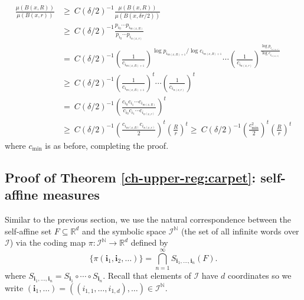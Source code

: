 \begin{align*}
\frac{\mu(B(x,R))}{\mu (B(x,r))}& \ge \ C(\delta/2)^{-1} \frac{\mu(B(x,R))}{\mu (B(x,\delta r/2))}  \\
& \ge \ C(\delta/2)^{-1} \frac{p_{i_0}\cdots p_{i_{m(x,R)}}}{p_{i_0}\cdots p_{i_{n(x,r)}}} \\
& = \ C(\delta/2)^{-1}  \left(\frac{1}{c_{i_{m(x,R)+1}}}\right)^{\log p_{i_{m(x,R)+1}}/\log c_{i_{m(x,R)+1}}} \cdots \left(\frac{1}{c_{i_{n(x,r)}}}\right)^{\frac{\log p_{i_{n(x,r)}}}{\log c_{i_{n(x,r)}}} } \\
& \ge\  C(\delta/2)^{-1}  \left( \frac{1}{c_{i_{m(x,R)+1}}}\right)^t \cdots \left( \frac{1}{c_{i_{n(x,r)}}}\right)^t \\
& = \ C(\delta/2)^{-1} \left( \frac{c_{i_0}c_{i_1} \cdots c_{i_{m(x,R)}}}{c_{i_0}c_{i_1} \cdots c_{i_{n(x,r)}}}\right)^t \\
& \ge \  C(\delta/2)^{-1} \left( \frac{c_{i_{m(x,R)}}c_{i_{n(x,r)}}}{2}  \right)^t  \left( \frac{R}{r}\right)^t \ge \  C(\delta/2)^{-1} \left( \frac{c_{\min}^2}{2}  \right)^t  \left( \frac{R}{r}\right)^t
\end{align*}
where $c_{\min}$ is as before, completing the proof.




\subsection{Proof of Theorem \ref{ch-upper-reg:carpet}: self-affine measures} \label{ch-upper-reg:self-affine}



Similar to the previous section, we use the natural correspondence between the self-affine set $F\subseteq \mathbb{R}^d$ and the symbolic space $\mathcal{I}^{\mathbb{N}}$ (the set of all infinite words over $\mathcal{I}$) via the coding map $\pi \colon \mathcal{I}^{\mathbb{N}} \rightarrow \mathbb{R}^d$ defined by 
\[
\{\pi(\textbf{i}_1, \textbf{i}_2, \ldots)\}=  \bigcap_{n=1}^\infty S_{\textbf{i}_1,\ldots, \textbf{i}_n}(F).
\]
where $ S_{\textbf{i}_1,\ldots, \textbf{i}_n} =  S_{\textbf{i}_1} \circ \cdots \circ S_{\textbf{i}_n}$.  Recall that elements of $\mathcal{I}$ have $d$ coordinates so we write $(\mathbf{i}_1,\ldots) = ((i_{1,1},\ldots, i_{1,d}),\ldots) \in \mathcal{I}^{\mathbb{N}} $.

